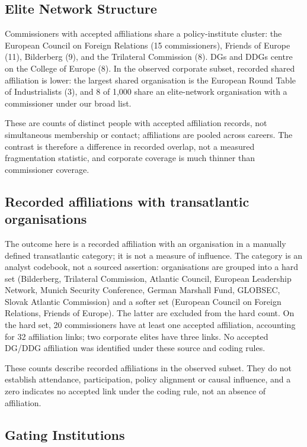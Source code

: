 \documentclass[11pt,a4paper]{article}
\begin{document}
\subsection{Elite Network Structure}

Commissioners with accepted affiliations share a policy-institute cluster: the European Council on Foreign Relations (15 commissioners), Friends of Europe (11), Bilderberg (9), and the Trilateral Commission (8). DGs and DDGs centre on the College of Europe (8). In the observed corporate subset, recorded shared affiliation is lower: the largest shared organisation is the European Round Table of Industrialists (3), and 8 of 1{,}000 share an elite-network organisation with a commissioner under our broad list.

These are counts of distinct people with accepted affiliation records, not simultaneous membership or contact; affiliations are pooled across careers. The contrast is therefore a difference in recorded overlap, not a measured fragmentation statistic, and corporate coverage is much thinner than commissioner coverage.

\subsection{Recorded affiliations with transatlantic organisations}

The outcome here is a recorded affiliation with an organisation in a manually defined transatlantic category; it is not a measure of influence. The category is an analyst codebook, not a sourced assertion: organisations are grouped into a hard set (Bilderberg, Trilateral Commission, Atlantic Council, European Leadership Network, Munich Security Conference, German Marshall Fund, GLOBSEC, Slovak Atlantic Commission) and a softer set (European Council on Foreign Relations, Friends of Europe). The latter are excluded from the hard count. On the hard set, 20 commissioners have at least one accepted affiliation, accounting for 32 affiliation links; two corporate elites have three links. No accepted DG/DDG affiliation was identified under these source and coding rules.

These counts describe recorded affiliations in the observed subset. They do not establish attendance, participation, policy alignment or causal influence, and a zero indicates no accepted link under the coding rule, not an absence of affiliation.

\subsection{Gating Institutions}
\end{document}
